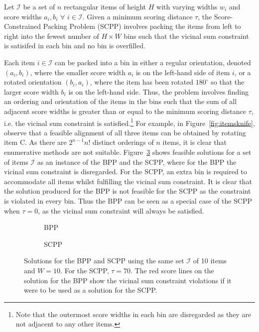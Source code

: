 \documentclass[authoryear]{elsarticle}
\begin{document}
\begin{definition}
	Let $\mathcal{I}$ be a set of $n$ rectangular items of height $H$ with varying widths $w_i$ and score widths $a_i, b_i$ $\forall$ $i \in \mathcal{I}$. Given a minimum scoring distance $\tau$, the Score-Constrained Packing Problem (SCPP) involves packing the items from left to right into the fewest number of $H \times W$ bins such that the vicinal sum constraint is satisifed in each bin and no bin is overfilled.
	\label{defn:scsp}
\end{definition}	

\noindent Each item $i \in \mathcal{I}$ can be packed into a bin in either a regular orientation, denoted $(a_i, b_i)$, where the smaller score width $a_i$ is on the left-hand side of item $i$, or a rotated orientation $(b_i, a_i)$, where the item has been rotated $180^{\circ}$ so that the larger score width $b_i$ is on the left-hand side. Thus, the problem involves finding an ordering and orientation of the items in the bins such that the sum of all adjacent score widths is greater than or equal to the minimum scoring distance $\tau$, i.e. the vicinal sum constraint is satisfied.\footnote{Note that the outermost score widths in each bin are disregarded as they are not adjacent to any other items.} For example, in Figure~\ref{fig:itemsknife}, observe that a feasible alignment of all three items can be obtained by rotating item C. As there are $2^{n-1} n!$ distinct orderings of $n$ items, it is clear that enumerative methods are not suitable. Figure~\ref{fig:bppvscpp} shows feasible solutions for a set of items $\mathcal{I}$ as an instance of the BPP and the SCPP, where for the BPP the vicinal sum constraint is disregarded. For the SCPP, an extra bin is required to accommodate all items whilst fulfilling the vicinal sum constraint. It is clear that the solution produced for the BPP is not feasible for the SCPP as the constraint is violated in every bin. Thus the BPP can be seen as a special case of the SCPP when $\tau=0$, as the vicinal sum constraint will always be satisfied.

\begin{figure}[H]
	\centering	
	\begin{subfigure}[h]{0.38\textwidth}
		
		\caption{BPP}
		\label{fig:bpp}
	\end{subfigure} \hspace{15mm}
	\begin{subfigure}[h]{0.38\textwidth}
		
		\caption{SCPP}
		\label{fig:scpp}
	\end{subfigure}
	\caption{Solutions for the BPP and SCPP using the same set $\mathcal{I}$ of 10 items and $W = 10$. For the SCPP, $\tau = 70$. The red score lines on the solution for the BPP show the vicinal sum constraint violations if it were to be used as a solution for the SCPP.}	
	\label{fig:bppvscpp}
\end{figure}
\end{document}
